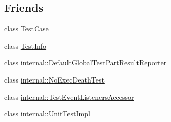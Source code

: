 \subsection*{Friends}
\begin{DoxyCompactItemize}
\item 
class \hyperlink{classtesting_1_1_test_event_listeners_aff779e55b06adfa7c0088bd10253f0f0}{Test\+Case}
\item 
class \hyperlink{classtesting_1_1_test_event_listeners_a4c49c2cdb6c328e6b709b4542f23de3c}{Test\+Info}
\item 
class \hyperlink{classtesting_1_1_test_event_listeners_abae39633da9932847b41cb80efd62115}{internal\+::\+Default\+Global\+Test\+Part\+Result\+Reporter}
\item 
class \hyperlink{classtesting_1_1_test_event_listeners_afddba49fdf3f493532b4d5efb9814f4e}{internal\+::\+No\+Exec\+Death\+Test}
\item 
class \hyperlink{classtesting_1_1_test_event_listeners_addbc107b6b445617c880182bd4f44cf9}{internal\+::\+Test\+Event\+Listeners\+Accessor}
\item 
class \hyperlink{classtesting_1_1_test_event_listeners_acc0a5e7573fd6ae7ad1878613bb86853}{internal\+::\+Unit\+Test\+Impl}
\end{DoxyCompactItemize}


